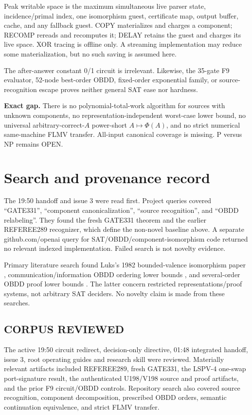 \documentclass[11pt]{article}
\begin{document}
Peak writable space is the maximum simultaneous live parser state,
incidence/primal index, one isomorphism guest, certificate map, output buffer,
cache, and any fallback guest.  COPY materializes and charges a component;
RECOMP rereads and recomputes it; DELAY retains the guest and charges its live
space.  XOR tracing is offline only.  A streaming implementation may reduce
some materialization, but no such saving is assumed here.

The after-answer constant 0/1 circuit is irrelevant.  Likewise, the 35-gate
F9 evaluator, 52-node best-order OBDD, fixed-order exponential family, or
source-recognition escape proves neither general SAT ease nor hardness.

\textbf{Exact gap.}  There is no polynomial-total-work algorithm for sources
with unknown components, no representation-independent worst-case lower bound,
no universal arbitrary-correct-$A$ power-short $A\mapsto\Phi(A)$, and no
strict numerical same-machine FLMV transfer.  All-input canonical coverage is
missing.  P versus NP remains OPEN.

\section{Search and provenance record}
The 19:50 handoff and issue 3 were read first.  Project queries covered
``GATE331'', ``component canonicalization'', ``source recognition'', and
``OBDD relabeling''.  They found the fresh GATE331 theorem and the earlier
REFEREE289 recognizer, which define the non-novel baseline above.  A separate
github.com/openai query for SAT/OBDD/component-isomorphism code returned no
relevant indexed implementation.  Failed search is not novelty evidence.

Primary literature search found Luks's 1982 bounded-valence isomorphism paper
\cite{luks1982}, communication/information OBDD ordering lower bounds
\cite{krause1999}, and several-order OBDD proof lower bounds
\cite{buss2021}.  The latter concern restricted representations/proof systems,
not arbitrary SAT deciders.  No novelty claim is made from these searches.

\subsection*{CORPUS REVIEWED}
The active 19:50 circuit redirect, decision-only directive, 01:48 integrated
handoff, issue 3, root operating guides and research skill were reviewed.
Materially relevant artifacts included REFEREE289, fresh GATE331, the LSPV-4
one-swap port-signature result, the authenticated U198/V198 source and proof
artifacts, and the prior F9 circuit/OBDD controls.  Repository search also
covered source recognition, component decomposition, prescribed OBDD orders,
semantic continuation equivalence, and strict FLMV transfer.
\end{document}
